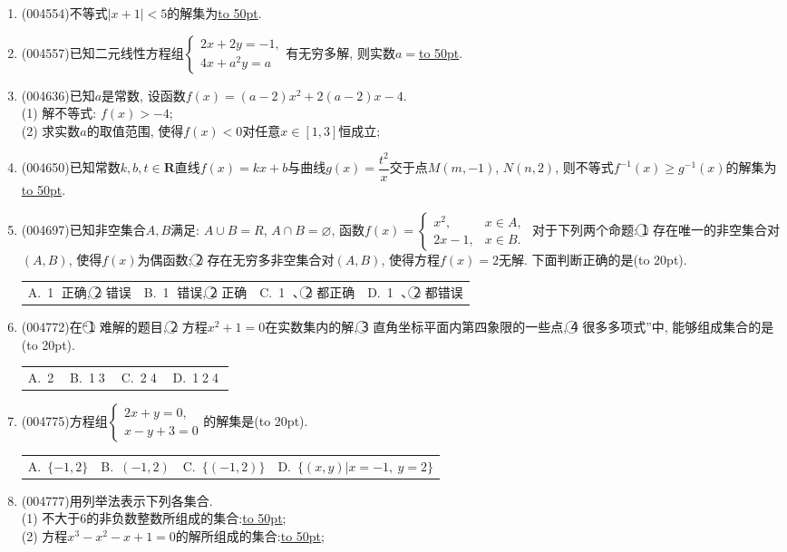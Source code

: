 \documentclass[10pt,a4paper]{article}
\newcommand{\blank}[1]{\underline{\hbox to #1pt{}}}
\newcommand{\bracket}[1]{(\hbox to #1pt{})}
\newcommand{\fourch}[4]{\par\begin{tabular}{p{.23\textwidth}p{.23\textwidth}p{.23\textwidth}p{.23\textwidth}}
A.~#1 &B.~#2& C.~#3& D.~#4
\end{tabular}}
\begin{document}
\begin{enumerate}[1.]
\fourch{充分不必要条件}{必要不充分条件}{充要条件}{既不充分也不必要条件}
\item {\tiny (004554)}不等式$|x+1|<5$的解集为\blank{50}.
\item {\tiny (004557)}已知二元线性方程组$\begin{cases}
    2x+2y=-1, \\ 4x+a^2y=a
\end{cases}$有无穷多解, 则实数$a=$\blank{50}.
\item {\tiny (004636)}已知$a$是常数, 设函数$f(x)=(a-2)x^2+2(a-2)x-4$.\\
(1) 解不等式: $f(x)>-4$;\\
(2) 求实数$a$的取值范围, 使得$f(x)<0$对任意$x\in [1,3]$恒成立;
\item {\tiny (004650)}已知常数$k,b,t\in \mathbf{R}$直线$f(x)=kx+b$与曲线$g(x)=\dfrac{t^2}x$交于点$M(m,-1)$, $N(n,2)$, 则不等式$f^{-1}(x)\ge g^{-1}(x)$的解集为\blank{50}.
\item {\tiny (004697)}已知非空集合$A,B$满足: $A\cup B=R$, $A\cap B=\varnothing$, 函数$f(x)=\begin{cases}
x^2, &  x\in A,  \\ 2x-1, &  x\in B.  \end{cases}$ 对于下列两个命题: \textcircled{1} 存在唯一的非空集合对$(A,B)$, 使得$f(x)$为偶函数; \textcircled{2} 存在无穷多非空集合对$(A,B)$, 使得方程$f(x)=2$无解. 下面判断正确的是\bracket{20}.
\fourch{\textcircled{1} 正确, \textcircled{2} 错误}{\textcircled{1} 错误, \textcircled{2} 正确}{\textcircled{1} 、\textcircled{2} 都正确}{\textcircled{1} 、\textcircled{2} 都错误}
\item {\tiny (004772)}在``\textcircled{1} 难解的题目, \textcircled{2} 方程$x^2+1=0$在实数集内的解, \textcircled{3} 直角坐标平面内第四象限的一些点, \textcircled{4} 很多多项式''中, 能够组成集合的是\bracket{20}.
\fourch{\textcircled{2}}{\textcircled{1}\textcircled{3}}{\textcircled{2}\textcircled{4}}{\textcircled{1}\textcircled{2}\textcircled{4}}
\item {\tiny (004775)}方程组$\begin{cases} 2x+y=0, \\ x-y+3=0 \end{cases}$的解集是\bracket{20}.
\fourch{$\{-1,2\}$}{$(-1,2)$}{$\{(-1,2)\}$}{$\{(x,y)|x=-1, \ y=2\}$}
\item {\tiny (004777)}用列举法表示下列各集合.\\
(1) 不大于$6$的非负数整数所组成的集合:\blank{50};\\
(2) 方程$x^3-x^2-x+1=0$的解所组成的集合:\blank{50};\\

\end{enumerate}
\end{document}
